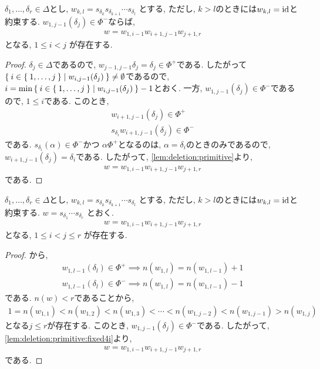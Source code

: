 \begin{lemma}
  \label{lem:deletion:primitive:fixed4i}
  $\delta_1,\ldots,\delta_r \in\Delta$とし,
  $w_{k,l}=s_{\delta_k}s_{\delta_{k+1}}\cdots s_{\delta_l}$
  とする, ただし, $k>l$のときには$w_{k,l}=\operatorname{id}$と約束する.
  $w_{1,j-1}(\delta_{j})\in\Phi^-$ならば,
  \begin{align*}
    w=w_{1,i-1}w_{i+1,j-1}w_{j+1,r}
  \end{align*}
  となる, $1\leq i < j$
  が存在する.
\end{lemma}

\begin{proof}
  $\delta_{j}\in\Delta$であるので, 
  $w_{j-1,j-1}\delta_{j}=\delta_{j}\in\Phi^+$である.
  したがって $\Set{i\in\Set{1,\ldots,j}|w_{i,j-1}(\delta_{j})}\neq \emptyset$であるので,
  $i=\min\Set{i\in\Set{1,\ldots,j}|w_{i,j-1}(\delta_{j})}-1$とおく.
  一方, $w_{1,j-1}(\delta_{j})\in\Phi^-$であるので,
  $1\leq i$である. このとき,
  \begin{align*}
    w_{i+1,j-1}(\delta_{j})\in \Phi^+\\
   s_{\delta_{i}} w_{i+1,j-1}(\delta_{j})\in \Phi^-
  \end{align*}
  である.
  $s_{\delta_{i}}(\alpha)\in \Phi^-$かつ
  $\alpha \Phi^+$となるのは,
  $\alpha=\delta_i$のときのみであるので,
  $w_{i+1,j-1}(\delta_{j})=\delta_i$である.
  したがって, \cref{lem:deletion:primitive}より,
  \begin{align*}
    w=w_{1,i-1}w_{i+1,j-1}w_{j+1,r}
  \end{align*}
  である.
\end{proof}

\begin{prop}
  \label{thm:deletionproperty}
  $\delta_1,\ldots,\delta_r \in\Delta$とし,
  $w_{k,l}=s_{\delta_k}s_{\delta_{k+1}}\cdots s_{\delta_l}$
  とする, ただし, $k>l$のときには$w_{k,l}=\operatorname{id}$と約束する.
  $w=s_{\delta_1}\cdots s_{\delta_r}$
  とおく.
  \begin{align*}
    w=w_{1,i-1}w_{i+1,j-1}w_{j+1,r}
  \end{align*}  
  となる, $1\leq i < j \leq r$
  が存在する.
\end{prop}

\begin{proof}
  から,
  \begin{align*}
    w_{1,l-1}(\delta_{l})\in\Phi^+ \implies n(w_{1,l})=n(w_{1,l-1})+1\\
    w_{1,l-1}(\delta_{l})\in\Phi^- \implies n(w_{1,l})=n(w_{1,l-1})-1
  \end{align*}
  である.  $n(w)<r$であることから,
  \begin{align*}
    1=n(w_{1,1})<n(w_{1,2})<n(w_{1,3})<\cdots<n(w_{1,j-2})<n(w_{1,j-1})>n(w_{1,j})
  \end{align*}
  となる$j\leq r$が存在する.
  このとき, $w_{1,j-1}(\delta_{j})\in\Phi^-$である.
  したがって,
  \cref{lem:deletion:primitive:fixed4i}より,
  \begin{align*}
    w=w_{1,i-1}w_{i+1,j-1}w_{j+1,r}
  \end{align*}
  である.
  
\end{proof}

